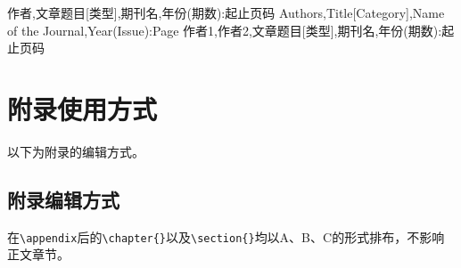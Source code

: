 \documentclass{GZHUMaster}
\begin{document}
\cleardoublepage{}
\makeatletter
\renewcommand{\@biblabel}[1]{\makebox[2em][l]{[#1]}}
\makeatother
{}
\begin{thebibliography}{0}
   作者,文章题目[类型],期刊名,年份(期数):起止页码
   Authors,Title[Category],Name of the Journal,Year(Issue):Page
   作者1,作者2,文章题目[类型],期刊名,年份(期数):起止页码
\end{thebibliography}

\appendix
\chapter{附录使用方式}
以下为附录的编辑方式。
\section{附录编辑方式}
在\verb|\appendix|后的\verb|\chapter{}|以及\verb|\section{}|均以A、B、C的形式排布，不影响正文章节。


\backmatter
\cleardoublepage
\end{document}
